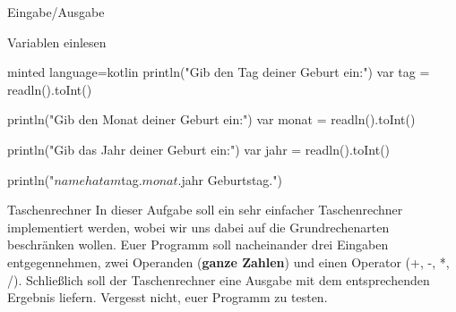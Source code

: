 \begin{task}[points=auto]{Eingabe/Ausgabe }
\begin{subtask*}[points=0]{Variablen einlesen}
\begin{solution}
\begin{codeBlock}[]{minted language=kotlin}
                println("Gib den Tag deiner Geburt ein:")
                var tag = readln().toInt()

                println("Gib den Monat deiner Geburt ein:")
                var monat = readln().toInt()

                println("Gib das Jahr deiner Geburt ein:")
                var jahr = readln().toInt()

                println("$name hat am $tag.$monat.$jahr Geburtstag.")
            \end{codeBlock}
        \end{solution}
    \end{subtask*}
    \begin{subtask*}[points=0]{Taschenrechner}
        In dieser Aufgabe soll ein sehr einfacher Taschenrechner implementiert werden, wobei wir uns dabei auf die Grundrechenarten beschränken wollen. Euer Programm soll nacheinander drei Eingaben entgegennehmen, zwei Operanden (\textbf{ganze Zahlen}) und einen Operator ({\ttfamily +, -, *, /}). Schließlich soll der Taschenrechner eine Ausgabe mit dem entsprechenden Ergebnis liefern. Vergesst nicht, euer Programm zu testen.

        \begin{solution}
        \end{solution}
    \end{subtask*}
\end{task}
